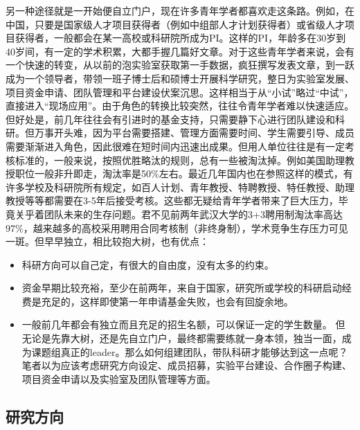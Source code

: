 \documentclass[
]{book}
\providecommand{\tightlist}{%
  \setlength{\itemsep}{0pt}\setlength{\parskip}{0pt}}
\begin{document}
另一种途径就是一开始便自立门户，现在许多青年学者都喜欢走这条路。例如，在中国，只要是国家级人才项目获得者（例如中组部人才计划获得者）或省级人才项目获得者，一般都会在某一高校或科研院所成为PI。这样的PI，年龄多在30岁到40岁间，有一定的学术积累，大都手握几篇好文章。对于这些青年学者来说，会有一个快速的转变，从以前的泡实验室获取第一手数据，疯狂撰写发表文章，到一跃成为一个领导者，带领一班子博士后和硕博士开展科学研究，整日为实验室发展、项目资金申请、团队管理和平台建设伏案沉思。这样相当于从``小试''略过``中试''，直接进入``现场应用''。由于角色的转换比较突然，往往令青年学者难以快速适应。但好处是，前几年往往会有引进时的基金支持，只需要静下心进行团队建设和科研。但万事开头难，因为平台需要搭建、管理方面需要时间、学生需要引导、成员需要渐渐进入角色，因此很难在短时间内迅速出成果。但用人单位往往是有一定考核标准的，一般来说，按照优胜略汰的规则，总有一些被淘汰掉。例如美国助理教授职位一般非升即走，淘汰率是50\%左右。最近几年国内也在参照这样的模式，有许多学校及科研院所有规定，如百人计划、青年教授、特聘教授、特任教授、助理教授等等都需要在3-5年后接受考核。这些都无疑给青年学者带来了巨大压力，毕竟关乎着团队未来的生存问题。君不见前两年武汉大学的3+3聘用制淘汰率高达97\%，越来越多的高校采用聘用合同考核制（非终身制），学术竞争生存压力可见一斑。但早早独立，相比较抱大树，也有优点：

\begin{itemize}
\tightlist
\item
  科研方向可以自己定，有很大的自由度，没有太多的约束。
\item
  资金早期比较充裕，至少在前两年，来自于国家，研究所或学校的科研启动经费是充足的，这样即使第一年申请基金失败，也会有回旋余地。
\item
  一般前几年都会有独立而且充足的招生名额，可以保证一定的学生数量。
  但无论是先靠大树，还是先自立门户，最终都需要练就一身本领，独当一面，成为课题组真正的leader。那么如何组建团队，带队科研才能够达到这一点呢？笔者以为应该考虑研究方向设定、成员招募，实验平台建设、合作圈子构建、项目资金申请以及实验室及团队管理等方面。
\end{itemize}

\hypertarget{ux7814ux7a76ux65b9ux5411}{%
\subsection{研究方向}\label{ux7814ux7a76ux65b9ux5411}}
\end{document}
